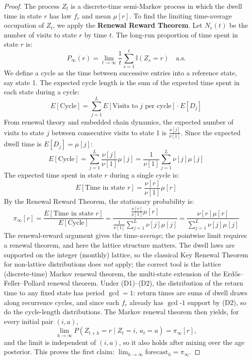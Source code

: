 \documentclass[11pt,a4paper]{article}
\begin{document}
\begin{proof}
The process $Z_t$ is a discrete-time semi-Markov process in which the dwell time in state $r$ has law $f_r$ and mean $\mu[r]$. To find the limiting time-average occupation of $Z_t$, we apply the \textbf{Renewal Reward Theorem}.
Let $N_r(t)$ be the number of visits to state $r$ by time $t$. The long-run proportion of time spent in state $r$ is:
\[
P_\infty(r) = \lim_{t \to \infty} \frac{1}{t} \sum_{s=1}^{t} \mathbb{I}(Z_s = r) \quad \text{a.s.} %
\]
We define a cycle as the time between successive entries into a reference state, say state 1. The expected cycle length is the sum of the expected time spent in each state during a cycle:
\[
E[\text{Cycle}] = \sum_{j=1}^L E[\text{Visits to } j \text{ per cycle}] \cdot E[D_j]
\]
From renewal theory and embedded chain dynamics, the expected number of visits to state $j$ between consecutive visits to state 1 is $\frac{\nu[j]}{\nu[1]}$. Since the expected dwell time is $E[D_j] = \mu[j]$:
\[
E[\text{Cycle}] = \sum_{j=1}^L \frac{\nu[j]}{\nu[1]} \mu[j] = \frac{1}{\nu[1]} \sum_{j=1}^L \nu[j] \mu[j]
\]
The expected time spent in state $r$ during a single cycle is:
\[
E[\text{Time in state } r] = \frac{\nu[r]}{\nu[1]} \mu[r]
\]
By the Renewal Reward Theorem, the stationary probability is:
\[
\pi_\infty[r] = \frac{E[\text{Time in state } r]}{E[\text{Cycle}]} = \frac{\frac{\nu[r]}{\nu[1]} \mu[r]}{\frac{1}{\nu[1]} \sum_{j=1}^L \nu[j] \mu[j]} = \frac{\nu[r] \mu[r]}{\sum_{j=1}^L \nu[j] \mu[j]}
\]
The renewal-reward argument gives the time-\emph{average}; the pointwise limit requires a renewal theorem, and here the lattice structure matters. The dwell laws are supported on the integer (monthly) lattice, so the classical Key Renewal Theorem for non-lattice distributions does \emph{not} apply; the correct tool is the lattice (discrete-time) Markov renewal theorem, the multi-state extension of the Erd\H{o}s--Feller--Pollard renewal theorem. Under (D1)--(D2), the distribution of the return time to any fixed state has period $\gcd = 1$: return times are sums of dwell draws along recurrence cycles, and since each $f_r$ already has $\gcd$-$1$ support by (D2), so do the cycle-length distributions. The Markov renewal theorem then yields, for every initial pair $(i, a)$, %
\[
\lim_{h \to \infty} P(Z_{t+h} = r \mid Z_t = i,\, a_t = a) = \pi_\infty[r], %
\]
and the limit is independent of $(i, a)$, so it also holds after mixing over the age posterior. This proves the first claim: $\lim_{h \to \infty} \text{forecast}_h = \pi_\infty$. %


\end{proof}
\end{document}
